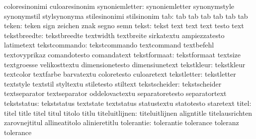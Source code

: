                            coloresinonimi            culoaresinonim
           synoniemletter: synoniemletter            synonymstyle
                           synonymstil               stylsynonyma
                           stilesinonimi             stilsinonim
                      tab: tab                       tab
                           tab                       tab
                           tab                       tab
                    teken: teken                     sign
                           zeichen                   znak
                           segno                     semn
                    tekst: tekst                     text
                           text                      text
                           testo                     text
             tekstbreedte: tekstbreedte              textwidth
                           textbreite                sirkatextu
                           ampiezzatesto             latimetext
            tekstcommando: tekstcommando             textcommand
                           textbefehl                textovyprikaz
                           comandotesto              comandatext
             tekstformaat: tekstformaat              textsize
                           textgroesse               velikosttextu
                           dimensionetesto           dimensiunetext
               tekstkleur: tekstkleur                textcolor
                           textfarbe                 barvatextu
                           coloretesto               culoaretext
              tekstletter: tekstletter               textstyle
                           textstil                  styltextu
                           stiletesto                stiltext
            tekstscheider: tekstscheider             textseparator
                           textseparator             oddelovactextu
                           separatoretesto           separatortext
              tekststatus: tekststatus               textstate
                           textstatus                statustextu
                           statotesto                staretext
                    titel: titel                     title
                           titel                     titul
                           titolo                    titlu
           titeluitlijnen: titeluitlijnen            aligntitle
                           titelausrichten           zarovnejtitul
                           allineatitolo             alinieretitlu
               tolerantie: tolerantie                tolerance
                           toleranz                  tolerance
